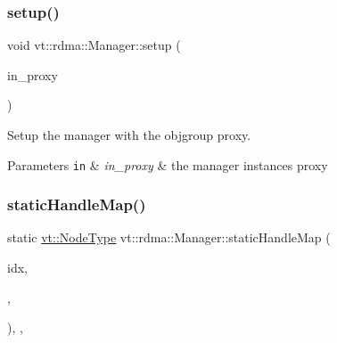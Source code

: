\mbox{\label{structvt_1_1rdma_1_1_manager_a15ba4b8e5b58df7f050fc1cdaf5f2bcd}} 
\subsubsection{\texorpdfstring{setup()}{setup()}}
{\footnotesize\ttfamily void vt\+::rdma\+::\+Manager\+::setup (\begin{DoxyParamCaption}\item[{\hyperlink{structvt_1_1rdma_1_1_manager_a75d5cdc6428ea19f5ec665b04dcd7166}{Proxy\+Type}}]{in\+\_\+proxy }\end{DoxyParamCaption})\hspace{0.3cm}{\ttfamily [private]}}



Setup the manager with the objgroup proxy. 


\begin{DoxyParams}[1]{Parameters}
\mbox{\tt in}  & {\em in\+\_\+proxy} & the manager instance\textquotesingle{}s proxy \\
\hline
\end{DoxyParams}
\mbox{\label{structvt_1_1rdma_1_1_manager_a4a4972102f481ce6190cf8cf01a83cb8}} 
\subsubsection{\texorpdfstring{static\+Handle\+Map()}{staticHandleMap()}}
{\footnotesize\ttfamily static \hyperlink{namespacevt_a866da9d0efc19c0a1ce79e9e492f47e2}{vt\+::\+Node\+Type} vt\+::rdma\+::\+Manager\+::static\+Handle\+Map (\begin{DoxyParamCaption}\item[{\hyperlink{namespacevt_a3bab786053b74a3d856fff1412ffa73a}{vt\+::\+Index2D} $\ast$}]{idx,  }\item[{\hyperlink{namespacevt_a3bab786053b74a3d856fff1412ffa73a}{vt\+::\+Index2D} $\ast$}]{,  }\item[{\hyperlink{namespacevt_a866da9d0efc19c0a1ce79e9e492f47e2}{vt\+::\+Node\+Type}}]{ }\end{DoxyParamCaption})\hspace{0.3cm}{\ttfamily [inline]}, {\ttfamily [static]}, {\ttfamily [private]}}



